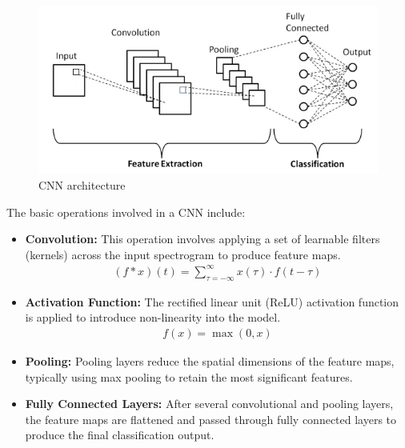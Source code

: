 \begin{figure}[h!]
    \centering
    \includegraphics{images/Convolution.png}
    \caption{CNN architecture}%
\end{figure}

The basic operations involved in a CNN include:
\begin{itemize}
    \item \textbf{Convolution:} This operation involves applying a set of
          learnable filters (kernels) across the input spectrogram to produce feature
          maps.
          \begin{eqnarray}
              (f * x)(t) = \sum_{\tau = -\infty}^{\infty} x(\tau) \cdot f(t -
              \tau)
          \end{eqnarray}

    \item \textbf{Activation Function:} The rectified linear unit (ReLU)
          activation function is applied to introduce non-linearity into the model.
          \begin{eqnarray}
              f(x) = \max(0, x)
          \end{eqnarray}

    \item \textbf{Pooling:} Pooling layers reduce the spatial dimensions of the
          feature maps, typically using
          max pooling to retain the most significant features.
    \item \textbf{Fully Connected Layers:} After several convolutional and
          pooling layers, the feature maps
          are flattened and passed through fully connected layers to produce the
          final classification output.
\end{itemize}

